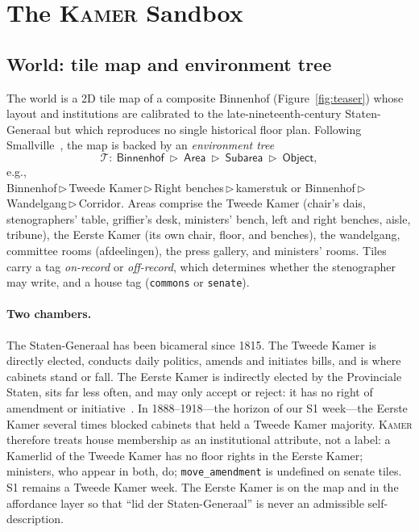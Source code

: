 \documentclass[sigconf,review,anonymous]{acmart}
\newcommand{\sys}{\textsc{Kamer}}
\begin{document}
\section{The \sys{} Sandbox}
\label{sec:sandbox}

\subsection{World: tile map and environment tree}

The world is a 2D tile map of a composite Binnenhof
(Figure~\ref{fig:teaser}) whose layout and institutions are calibrated to
the late-nineteenth-century Staten-Generaal but which reproduces no single
historical floor plan. Following Smallville~\cite{park2023generative}, the
map is backed by an \emph{environment tree}
\[
\mathcal{T}:\ \textsf{Binnenhof}\ \triangleright\ \textsf{Area}\ \triangleright\
\textsf{Subarea}\ \triangleright\ \textsf{Object},
\]
e.g.,\\ \textsf{Binnenhof\,$\triangleright$\,Tweede Kamer\,$\triangleright$\,Right benches\,$\triangleright$\,kamerstuk}
or
\textsf{Binnenhof\,$\triangleright$\,Wandelgang\,$\triangleright$\,Corridor}.
Areas comprise the Tweede Kamer (chair's dais, stenographers' table,
griffier's desk, ministers' bench, left and right benches, aisle, tribune),
the Eerste Kamer (its own chair, floor, and benches),
the wandelgang, committee rooms (afdeelingen), the press gallery, and
ministers' rooms. Tiles carry a tag \emph{on-record} or \emph{off-record},
which determines whether the stenographer may write, and a house tag
(\texttt{commons} or \texttt{senate}).

\paragraph{Two chambers.} The Staten-Generaal has been bicameral since 1815.
The Tweede Kamer is directly elected, conducts daily politics, amends and
initiates bills, and is where cabinets stand or fall. The Eerste Kamer is
indirectly elected by the Provinciale Staten, sits far less often, and may
only accept or reject: it has no right of amendment or initiative~\cite{pdc2024kamers}.
In 1888--1918---the horizon of our S1 week---the Eerste Kamer several times
blocked cabinets that held a Tweede Kamer majority. \sys{} therefore treats
house membership as an institutional attribute, not a label: a Kamerlid of
the Tweede Kamer has no floor rights in the Eerste Kamer; ministers, who
appear in both, do; \texttt{move\_amendment} is undefined on senate tiles.
S1 remains a Tweede Kamer week. The Eerste Kamer is on the map and in the
affordance layer so that ``lid der Staten-Generaal'' is never an admissible
self-description.
\end{document}
